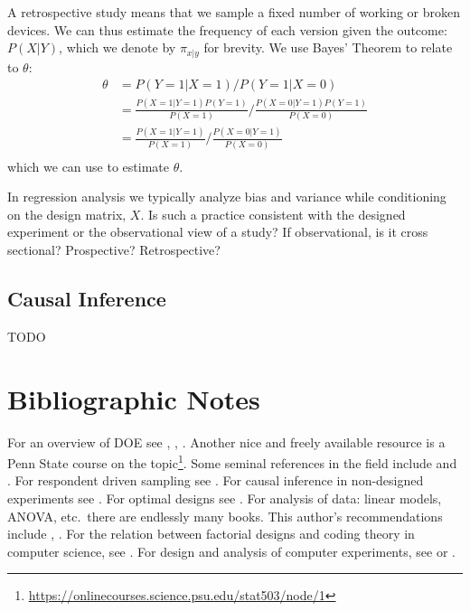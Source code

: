 A retrospective study means that we sample a fixed number of working or broken devices. 
We can thus estimate the frequency of each version given the outcome: $P(X|Y)$, which we denote by $\pi_{x|y}$ for brevity.
We use Bayes' Theorem to relate to $\theta$:
\begin{align*}
	\theta
	&= P(Y=1|X=1) / P(Y=1|X=0) \\
	&= \frac{P(X=1|Y=1)P(Y=1)}{P(X=1)} / \frac{P(X=0|Y=1)P(Y=1)}{P(X=0)} \\
	&= \frac{P(X=1|Y=1)}{P(X=1)} / \frac{P(X=0|Y=1)}{P(X=0)} \\
	\end{align*}
which we can use to estimate $\theta$. 




\begin{think}
	In regression analysis we typically analyze bias and variance while conditioning on the design matrix, $X$. 
	Is such a practice consistent with the designed experiment or the observational view of a study?
	If observational, is it cross sectional? Prospective? Retrospective? 
\end{think}

\subsection{Causal Inference}
\label{sec:causal}
TODO







\section{Bibliographic Notes}
For an overview of DOE see \cite{cox_theory_2000}, \cite{mason_statistical_2003}, \cite{everitt_cambridge_2010}. 
Another nice and freely available resource is a Penn State course on the topic\footnote{\url{https://onlinecourses.science.psu.edu/stat503/node/1}}. 
Some seminal references in the field include \cite{fisher_design_1960} and \cite{box_statistics_1978}.
For respondent driven sampling see \cite{berchenko_modeling_2013}.
For causal inference in non-designed experiments see \cite{rosenbaum_observational_2002}. 
For optimal designs see \cite{pukelsheim_optimal_1993}.
For analysis of data: linear models, ANOVA, etc.\ there are endlessly many books. This author's recommendations include \cite{hocking_analysis_1985}, \cite{greene_econometric_2003}. 
For the relation between factorial designs and coding theory in computer science, see \cite{hill_first_1986}. 
For design and analysis of computer experiments, see \cite{sacks_design_1989} or \cite{santner_design_2013}.

